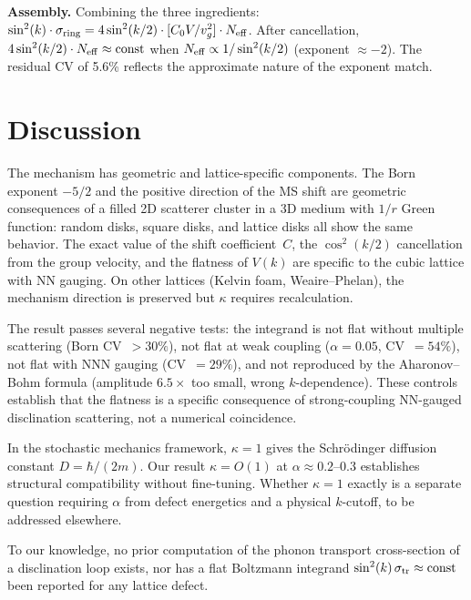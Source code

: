 \documentclass[aps,prl,twocolumn,superscriptaddress]{revtex4-2}
\begin{document}
\textbf{Assembly.}
Combining the three ingredients:
$\sin^2(k) \cdot \sigma_{\rm ring}
= 4\sin^2(k/2) \cdot [C_0 V / v_g^2] \cdot N_{\rm eff}$.
After cancellation,
$4\sin^2(k/2) \cdot N_{\rm eff} \approx \mathrm{const}$ when
$N_{\rm eff} \propto 1/\sin^2(k/2)$ (exponent $\approx -2$). The residual
CV of 5.6\% reflects the approximate nature of the exponent match.

\section{Discussion}

The mechanism has geometric and lattice-specific components. The Born
exponent $-5/2$ and the positive direction of the MS shift are geometric
consequences of a filled 2D scatterer cluster in a 3D medium with $1/r$
Green function: random disks, square disks, and lattice disks all show the
same behavior. The exact value of the shift coefficient~$C$, the
$\cos^2(k/2)$ cancellation from the group velocity, and the flatness of
$V(k)$ are specific to the cubic lattice with NN gauging. On other lattices
(Kelvin foam, Weaire--Phelan), the mechanism direction is preserved but
$\kappa$ requires recalculation.

The result passes several negative tests: the integrand is not flat without
multiple scattering (Born CV~$> 30\%$), not flat at weak coupling
($\alpha = 0.05$, CV~$= 54\%$), not flat with NNN gauging (CV~$= 29\%$),
and not reproduced by the Aharonov--Bohm formula (amplitude $6.5\times$ too
small, wrong $k$-dependence). These controls establish that the flatness is
a specific consequence of strong-coupling NN-gauged disclination scattering,
not a numerical coincidence.

In the stochastic mechanics framework, $\kappa = 1$ gives the
Schr\"odinger diffusion constant $D = \hbar/(2m)$. Our result
$\kappa = O(1)$ at $\alpha \approx 0.2$--$0.3$ establishes structural
compatibility without fine-tuning. Whether $\kappa = 1$ exactly is a
separate question requiring $\alpha$ from defect energetics and a physical
$k$-cutoff, to be addressed elsewhere.

To our knowledge, no prior computation of the phonon transport cross-section
of a disclination loop exists, nor has a flat Boltzmann integrand
$\sin^2(k)\,\sigma_{\rm tr} \approx \mathrm{const}$ been reported for any
lattice defect.

\end{document}
